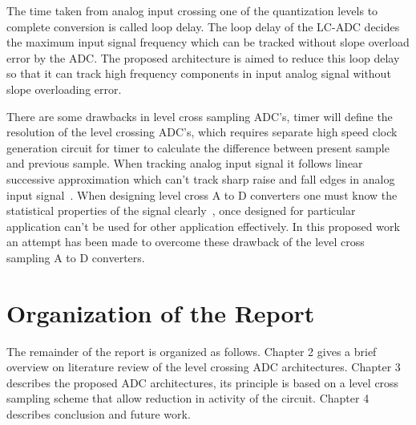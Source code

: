 \par
\hspace{0.6cm} The time taken from analog input crossing one of the quantization levels to complete conversion is called loop delay. The loop delay of the LC-ADC decides the maximum input signal frequency which can be tracked without slope overload error by the ADC. The proposed architecture is aimed to reduce this loop delay so that it can track high frequency components in input analog signal without slope overloading error.

\par
\hspace{1.2cm} There are some drawbacks in level cross sampling ADC's, timer will define the resolution of the level crossing ADC's, which requires separate high speed clock generation circuit for timer to calculate the difference between present sample and previous sample. When tracking analog input signal it follows linear successive approximation which can't track sharp raise and fall edges in analog input signal~\cite{5672382}. When designing level cross A to D converters one must know the statistical properties of the signal clearly~\cite{allier2005asynchronous}, once designed for particular application can't be used for other application effectively. In this proposed work an attempt has been made to overcome these drawback of the level cross sampling A to D converters.


\section{Organization of the Report}

\par
\hspace{1.2cm} The remainder of the report is organized as follows. Chapter 2 gives a brief overview on literature review of the level crossing ADC architectures. Chapter 3 describes the  proposed ADC architectures, its principle is based on a level cross sampling scheme that allow reduction in activity of the circuit. Chapter 4 describes conclusion and future work.




